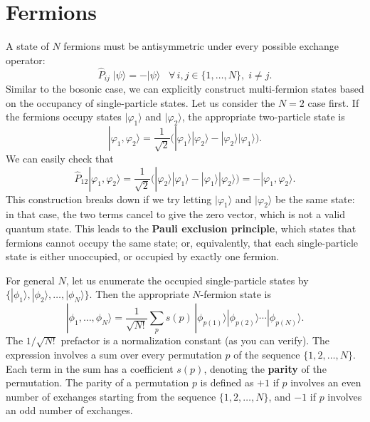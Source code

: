 \documentclass[pra,12pt]{revtex4}
\begin{document}
\section{Fermions}

A state of $N$ fermions must be antisymmetric under every possible
exchange operator:
$$\hat{P}_{ij}\; |\psi\rangle = -|\psi\rangle \;\;\; \forall\, i,j\in\{1,\dots,N\}, \; i\ne j.$$
Similar to the bosonic case, we can explicitly construct multi-fermion
states based on the occupancy of single-particle states.  Let us
consider the $N=2$ case first.  If the fermions occupy states
$|\varphi_1\rangle$ and $|\varphi_2\rangle$, the appropriate two-particle
state is
$$|\varphi_1,\varphi_2\rangle = \frac{1}{\sqrt{2}} \Big(|\varphi_1\rangle|\varphi_2\rangle - |\varphi_2\rangle|\varphi_1\rangle\Big).$$
We can easily check that
$$\hat{P}_{12} |\varphi_1,\varphi_2\rangle = \frac{1}{\sqrt{2}} \Big(|\varphi_2\rangle|\varphi_1\rangle - |\varphi_1\rangle|\varphi_2\rangle\Big) = - |\varphi_1,\varphi_2\rangle.$$
This construction breaks down if we try letting $|\varphi_1\rangle$
and $|\varphi_2\rangle$ be the same state: in that case, the two terms
cancel to give the zero vector, which is not a valid quantum state.
This leads to the \textbf{Pauli exclusion principle}, which states
that fermions cannot occupy the same state; or, equivalently, that each
single-particle state is either unoccupied, or occupied by exactly one
fermion.

For general $N$, let us enumerate the occupied single-particle states
by $\{|\phi_1\rangle, |\phi_2\rangle,\dots,|\phi_N\rangle\}$.  Then
the appropriate $N$-fermion state is
$$|\phi_1,\dots,\phi_N\rangle = \frac{1}{\sqrt{N!}} \sum_p s(p)\, |\phi_{p(1)}\rangle |\phi_{p(2)}\rangle \cdots |\phi_{p(N)}\rangle.$$
The $1/\sqrt{N!}$ prefactor is a normalization constant (as you can
verify).  The expression involves a sum over every permutation $p$ of
the sequence $\{1,2,\dots,N\}$.  Each term in the sum has a
coefficient $s(p)$, denoting the \textbf{parity} of the permutation.
The parity of a permutation $p$ is defined as $+1$ if $p$ involves an
even number of exchanges starting from the sequence $\{1,2,\dots,N\}$,
and $-1$ if $p$ involves an odd number of exchanges.
\end{document}
